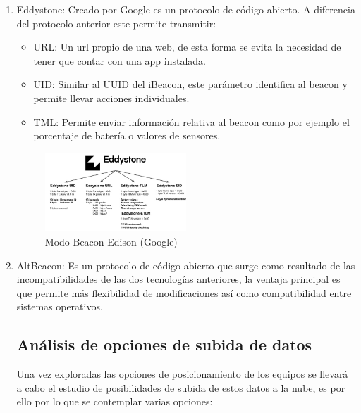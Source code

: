 \documentclass[paper=a4, fontsize=11pt,twoside]{scrartcl}	%
\begin{document}
\begin{enumerate}
\begin{center}
\begin{figure}[ht]
                        \label{fig:mesh2}
                    \end{figure}
                \end{center}
                \item Eddystone: Creado por Google es un protocolo de código abierto. A diferencia del protocolo anterior este 
                permite transmitir:
                \begin{itemize}
                    \item URL: Un url propio de una web, de esta forma se evita la necesidad de tener que contar con una app instalada.
                    \item UID: Similar al UUID del iBeacon, este parámetro identifica al beacon y permite llevar acciones individuales.
                    \item TML: Permite enviar información relativa al beacon como por ejemplo el porcentaje de batería o valores de sensores.
                \end{itemize}
                \begin{center}
                    \begin{figure}[ht]
                        \centering
                        \includegraphics[width=0.5\textwidth]{tipos_beacon_edison.PNG}
                        \caption{Modo Beacon Edison (Google) }
                        \label{fig:mesh3}
                    \end{figure}
                \end{center}
                \item AltBeacon: Es un protocolo de código abierto que surge como resultado de las incompatibilidades de las dos 
                tecnologías anteriores, la ventaja principal es que permite más flexibilidad de modificaciones así como compatibilidad 
                entre sistemas operativos.
    \subsection{Análisis de opciones de subida de datos}
        Una vez exploradas las opciones de posicionamiento de los equipos se llevará a cabo el estudio de posibilidades de subida de estos datos
        a la nube, es por ello por lo que se contemplar varias opciones:

\end{enumerate}
\end{document}
